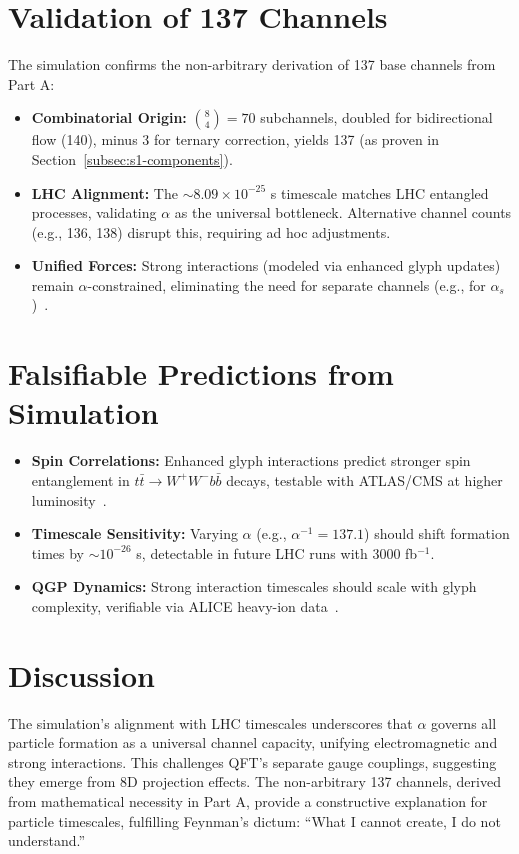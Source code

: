 \documentclass[pdflatex,sn-mathphys-num]{sn-jnl}
\theoremstyle{thmstyleone}
\theoremstyle{thmstyletwo}
\theoremstyle{thmstylethree}
\begin{document}
\section{Validation of 137 Channels}\label{sec:s2-validation}
The simulation confirms the non-arbitrary derivation of 137 base channels from Part A:
\begin{itemize}
    \item \textbf{Combinatorial Origin:} $\binom{8}{4} = 70$ subchannels, doubled for bidirectional flow (140), minus 3 for ternary correction, yields 137 (as proven in Section~\ref{subsec:s1-components}).
   
    \item \textbf{LHC Alignment:} The $\sim 8.09 \times 10^{-25}$ s timescale matches LHC entangled processes, validating $\alpha$ as the universal bottleneck. Alternative channel counts (e.g., 136, 138) disrupt this, requiring ad hoc adjustments.
   
    \item \textbf{Unified Forces:} Strong interactions (modeled via enhanced glyph updates) remain $\alpha$-constrained, eliminating the need for separate channels (e.g., for $\alpha_s$)~\cite{pdg2024}.
\end{itemize}


\section{Falsifiable Predictions from Simulation}\label{sec:s2-predictions}
\begin{itemize}
    \item \textbf{Spin Correlations:} Enhanced glyph interactions predict stronger spin entanglement in $t\bar{t} \rightarrow W^+W^-b\bar{b}$ decays, testable with ATLAS/CMS at higher luminosity~\cite{atlas2022entanglement}.
   
    \item \textbf{Timescale Sensitivity:} Varying $\alpha$ (e.g., $\alpha^{-1} = 137.1$) should shift formation times by $\sim 10^{-26}$ s, detectable in future LHC runs with 3000 fb$^{-1}$.
   
    \item \textbf{QGP Dynamics:} Strong interaction timescales should scale with glyph complexity, verifiable via ALICE heavy-ion data~\cite{alice2017femto}.
\end{itemize}


\section{Discussion}\label{sec:s2-discussion}
The simulation's alignment with LHC timescales underscores that $\alpha$ governs all particle formation as a universal channel capacity, unifying electromagnetic and strong interactions. This challenges QFT's separate gauge couplings, suggesting they emerge from 8D projection effects. The non-arbitrary 137 channels, derived from mathematical necessity in Part A, provide a constructive explanation for particle timescales, fulfilling Feynman's dictum: ``What I cannot create, I do not understand.''
\end{document}
